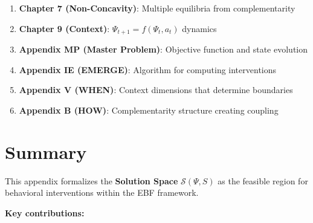 \begin{enumerate}
    \item \textbf{Chapter 7 (Non-Concavity)}: Multiple equilibria from complementarity
    \item \textbf{Chapter 9 (Context)}: $\Psi_{t+1} = f(\Psi_t, a_t)$ dynamics
    \item \textbf{Appendix MP (Master Problem)}: Objective function and state evolution
    \item \textbf{Appendix IE (EMERGE)}: Algorithm for computing interventions
    \item \textbf{Appendix V (WHEN)}: Context dimensions that determine boundaries
    \item \textbf{Appendix B (HOW)}: Complementarity structure creating coupling
\end{enumerate}

\section{Summary}
\label{sec:ss-summary}

This appendix formalizes the \textbf{Solution Space} $\mathcal{S}(\Psi, S)$ as the feasible region for behavioral interventions within the EBF framework.

\textbf{Key contributions:}

